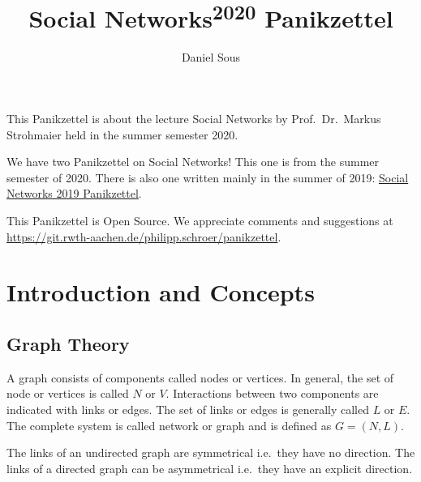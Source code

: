 \documentclass[english]{panikzettel}
\title{Social Networks\textsuperscript{2020} Panikzettel}
\author{Daniel Sous}
\begin{document}
\maketitle

\tableofcontents

\vspace{1cm}

This Panikzettel is about the lecture Social Networks by Prof.~Dr.~Markus Strohmaier held in the summer semester 2020.

\begin{tcolorbox}[
	colframe=panikgreen,
	colback=white,
	toprule=0pt,
	boxrule=0.75pt,
]
	\sffamily
	We have two Panikzettel on Social Networks!
	This one is from the summer semester of 2020.
	There is also one written mainly in the summer of 2019: \href{https://panikzettel.philworld.de/sn19.pdf}{Social Networks 2019 Panikzettel}.
\end{tcolorbox}

This Panikzettel is Open Source.
We appreciate comments and suggestions at \\
\url{https://git.rwth-aachen.de/philipp.schroer/panikzettel}.

\newpage
\section{Introduction and Concepts}

\subsection{Graph Theory}\label{sec:graph_basics}
A graph consists of components called nodes or vertices.
In general, the set of node or vertices is called $ N $ or $ V $.
Interactions between two components are indicated with links or edges.
The set of links or edges is generally called $ L $ or $ E $.
The complete system is called network or graph and is defined as $ G = (N,L) $.

The links of an undirected graph are symmetrical i.e.\ they have no direction.
The links of a directed graph can be asymmetrical i.e.\ they have an explicit direction.
\end{document}
